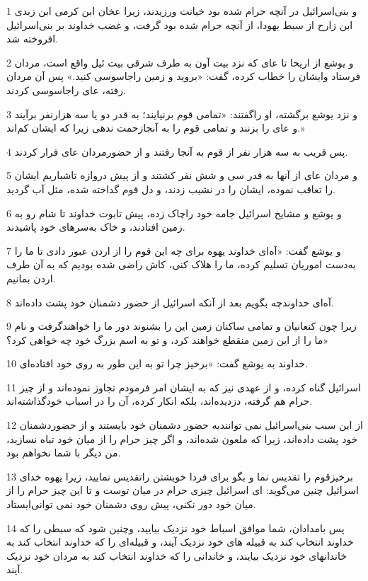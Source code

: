 \par 1 و بنی‌اسرائیل در آنچه حرام شده بود خیانت ورزیدند، زیرا عخان ابن کرمی ابن زبدی ابن زارح از سبط یهودا، از آنچه حرام شده بود گرفت، و غضب خداوند بر بنی‌اسرائیل افروخته شد.
\par 2 و یوشع از اریحا تا عای که نزد بیت آون به طرف شرقی بیت ئیل واقع است، مردان فرستاد وایشان را خطاب کرده، گفت: «بروید و زمین راجاسوسی کنید.» پس آن مردان رفته، عای راجاسوسی کردند.
\par 3 و نزد یوشع برگشته، او راگفتند: «تمامی قوم برنیایند؛ به قدر دو یا سه هزارنفر برآیند و عای را بزنند و تمامی قوم را به آنجازحمت ندهی زیرا که ایشان کم‌اند.»
\par 4 پس قریب به سه هزار نفر از قوم به آنجا رفتند و از حضورمردان عای فرار کردند.
\par 5 و مردان عای از آنها به قدر سی و شش نفر کشتند و از پیش دروازه تاشباریم ایشان را تعاقب نموده، ایشان را در نشیب زدند، و دل قوم گداخته شده، مثل آب گردید.
\par 6 و یوشع و مشایخ اسرائیل جامه خود راچاک زده، پیش تابوت خداوند تا شام رو به زمین افتادند، و خاک به‌سرهای خود پاشیدند.
\par 7 و یوشع گفت: «آه‌ای خداوند یهوه برای چه این قوم را از اردن عبور دادی تا ما را به‌دست اموریان تسلیم کرده، ما را هلاک کنی، کاش راضی شده بودیم که به آن طرف اردن بمانیم.
\par 8 آه‌ای خداوندچه بگویم بعد از آنکه اسرائیل از حضور دشمنان خود پشت داده‌اند.
\par 9 زیرا چون کنعانیان و تمامی ساکنان زمین این را بشنوند دور ما را خواهندگرفت و نام ما را از این زمین منقطع خواهند کرد، و تو به اسم بزرگ خود چه خواهی کرد؟»
\par 10 خداوند به یوشع گفت: «برخیز چرا تو به این طور به روی خود افتاده‌ای.
\par 11 اسرائیل گناه کرده، و از عهدی نیز که به ایشان امر فرمودم تجاوز نموده‌اند و از چیز حرام هم گرفته، دزدیده‌اند، بلکه انکار کرده، آن را در اسباب خودگذاشته‌اند.
\par 12 از این سبب بنی‌اسرائیل نمی توانندبه حضور دشمنان خود بایستند و از حضوردشمنان خود پشت داده‌اند، زیرا که ملعون شده‌اند، و اگر چیز حرام را از میان خود تباه نسازید، من دیگر با شما نخواهم بود.
\par 13 برخیزقوم را تقدیس نما و بگو برای فردا خویشتن راتقدیس نمایید، زیرا یهوه خدای اسرائیل چنین می‌گوید: ای اسرائیل چیزی حرام در میان توست و تا این چیز حرام را از میان خود دور نکنی، پیش روی دشمنان خود نمی توانی‌ایستاد.
\par 14 پس بامدادان، شما موافق اسباط خود نزدیک بیایید، وچنین شود که سبطی را که خداوند انتخاب کند به قبیله های خود نزدیک آیند، و قبیله‌ای را که خداوند انتخاب کند به خاندانهای خود نزدیک بیایند، و خاندانی را که خداوند انتخاب کند به مردان خود نزدیک آیند.
